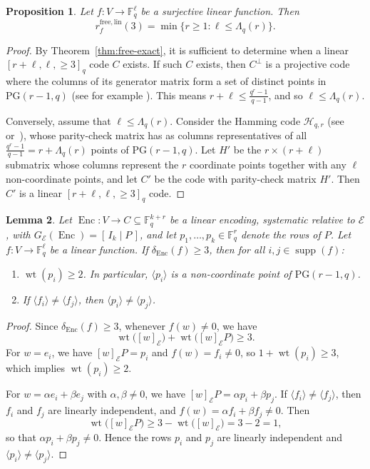 \documentclass[a4paper,12pt]{article}
\theoremstyle{plain}
\newtheorem{lemma}{Lemma}[section]
\newtheorem{proposition}[lemma]{Proposition}
\theoremstyle{definition}
\newcommand{\F}{\mathbb F}
\newcommand{\wt}{\operatorname{wt}}
\newcommand{\Enc}{\operatorname{Enc}}
\begin{document}
\begin{proposition}
\label{prop:free-distance-three}
Let $f\colon V\to\F_q^\ell$ be a surjective linear function. Then
\[
r_f^{\mathrm{free,lin}}(3)
=
\min\{r\geq1:\ell\leq\Lambda_q(r)\}.
\]
\end{proposition}

\begin{proof}
By Theorem~\ref{thm:free-exact}, it is sufficient to determine when a linear $[r+\ell,\ell,\geq3]_q$ code $C$ exists. If such $C$ exists, then $C^\perp$ is a projective code where the columns of its generator matrix form a set of distinct points in $\mathrm{PG}(r-1,q)$ (see for example \cite[p.84]{ding2018}). 
This means
$r+\ell\leq\frac{q^r-1}{q-1}$, and so $\ell\leq\Lambda_q(r)$.

Conversely, assume that $\ell\leq\Lambda_q(r)$.
Consider the Hamming code $\mathcal H_{q,r}$ (see~\cite[p.81]{ding2018} or~\cite[p. 29]{huffman2003}), whose
parity-check matrix has as columns representatives of all $\frac{q^r-1}{q-1}=r+\Lambda_q(r)$ points of $\mathrm{PG}(r-1,q)$.
Let $H'$ be the $r\times(r+\ell)$ submatrix whose columns represent
the $r$ coordinate points together with any $\ell$ non-coordinate
points, and let $C'$ be the code with parity-check matrix $H'$.
Then $C'$ is a linear $[r+\ell,\ell,\geq3]_q$ code.
\end{proof}


\begin{lemma}
\label{lem:distance-three-rows}
Let $\Enc\colon V\to C\subseteq\F_q^{k+r}$ be a linear encoding,
systematic relative to $\mathcal E$, with
$G_{\mathcal E}(\Enc)=[\,I_k\mid P\,]$, and let
$p_1,\dots,p_k\in\F_q^r$ denote the rows of $P$. Let
$f\colon V\to\F_q^\ell$ be a linear function. If
$\delta_{\Enc}(f)\geq3$, then for all
$i,j\in\operatorname{supp}(f)$:
\begin{enumerate}
\item $\wt(p_i)\geq2$. In particular, $\langle p_i\rangle$ is a
non-coordinate point of $\mathrm{PG}(r-1,q)$.
\item If $\langle f_i\rangle\neq\langle f_j\rangle$, then
$\langle p_i\rangle\neq\langle p_j\rangle$.
\end{enumerate}
\end{lemma}

\begin{proof}
Since $\delta_{\Enc}(f)\geq3$, whenever $f(w)\neq0$, we have
\[
\wt\bigl([w]_{\mathcal E}\bigr)+\wt\bigl([w]_{\mathcal E}P\bigr)
\geq3.
\]
For $w=e_i$, we have $[w]_{\mathcal E}P=p_i$ and
$f(w)=f_i\neq0$, so $1+\wt(p_i)\geq3$, which implies $\wt(p_i)\geq2$.


For  $w=\alpha e_i+\beta e_j$ with $\alpha,\beta\neq0$, we have
$[w]_{\mathcal E}P=\alpha p_i+\beta p_j$. If $\langle f_i\rangle\neq\langle f_j\rangle$, then $f_i$ and $f_j$ are linearly
independent, and  $f(w)=\alpha f_i+\beta f_j\neq0$. 
Then 
\[
\wt\bigl([w]_{\mathcal E}P\bigr) \ge 
3-\wt\bigl([w]_{\mathcal E}\bigr) = 
3-2=1, 
\]
so that $\alpha p_i+\beta p_j\neq0$. Hence the rows $p_i$
and $p_j$ are linearly independent and
$\langle p_i\rangle\neq\langle p_j\rangle$.
\end{proof}
\end{document}
